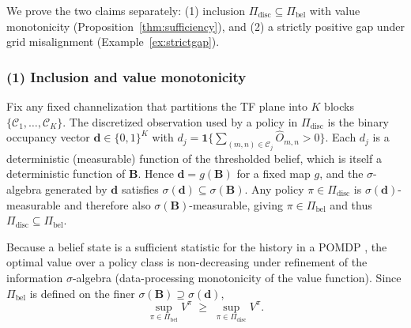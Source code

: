\documentclass[journal]{IEEEtran}
\newcommand{\Ind}{\mathbf{1}}             %
\newcommand{\cell}{(m,n)}                  %
\newcommand{\occ}{O}                       %
\newcommand{\belmap}{\bm{B}}               %
\newcommand{\pol}{\pi}                     %
\newcommand{\Vfun}{V}                      %
\newcommand{\PIbel}{\Pi_{\mathrm{bel}}}    %
\newcommand{\PIdis}{\Pi_{\mathrm{disc}}}   %
\begin{document}
We prove the two claims separately: (1) inclusion
$\PIdis\subseteq\PIbel$ with value monotonicity
(Proposition~\ref{thm:sufficiency}), and (2) a strictly positive
gap under grid misalignment (Example~\ref{ex:strictgap}).

\subsubsection*{(1) Inclusion and value monotonicity}
Fix any fixed channelization that partitions the TF plane into $K$ blocks
$\{\mathcal{C}_1,\dots,\mathcal{C}_K\}$. The discretized observation used by a
policy in $\PIdis$ is the binary occupancy vector
$\bm{d}\in\{0,1\}^{K}$ with $d_j=\Ind\{\sum_{\cell\in\mathcal{C}_j}
\hat{\occ}_{m,n}>0\}$. Each $d_j$ is a deterministic (measurable) function of
the thresholded belief, which is itself a deterministic function of
$\belmap$. Hence $\bm{d}=g(\belmap)$ for a fixed map $g$, and the
$\sigma$-algebra generated by $\bm{d}$ satisfies
$\sigma(\bm{d})\subseteq\sigma(\belmap)$. Any policy
$\pol\in\PIdis$ is $\sigma(\bm{d})$-measurable and therefore also
$\sigma(\belmap)$-measurable, giving $\pol\in\PIbel$ and thus
$\PIdis\subseteq\PIbel$.

Because a belief state is a sufficient statistic for the history in a POMDP
\cite{kaelbling1998planning}, the optimal value over a policy class is
non-decreasing under refinement of the information $\sigma$-algebra
(data-processing monotonicity of the value function). Since $\PIbel$ is
defined on the finer $\sigma(\belmap)\supseteq\sigma(\bm{d})$,
\begin{equation}
\sup_{\pol\in\PIbel}\Vfun^{\pol}
\;\ge\;
\sup_{\pol\in\PIdis}\Vfun^{\pol}.
\label{eq:appB_monotone}
\end{equation}
\end{document}
